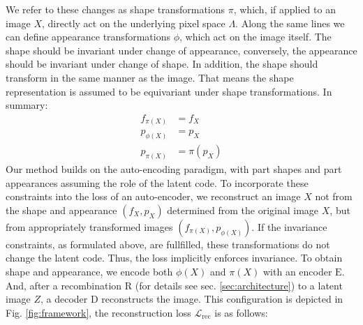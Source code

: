 	We refer to these changes as shape transformations $\pi$, which, if applied to an image $X$, directly act on the underlying pixel space $\Lambda$.
	Along the same lines we can define appearance transformations $\phi$, which act on the image itself.
	The shape should be invariant under change of appearance, conversely, the appearance should be invariant under change of shape.
	In addition, the shape should transform in the same manner as the image.
	That means the shape representation is assumed to be equivariant under shape transformations.
	In summary:
	\begin{align}
		f_{\pi(X)}  &= f_{X} \tag{invariance of appearance}\\
		p_{\phi(X)} &= p_X  \tag{invariance of shape}\\
		p_{\pi(X)} &= \pi(p_X) \tag{equivariance of shape}
	\label{eq:invar}
	\end{align} %
	Our method builds on the auto-encoding paradigm, with part shapes and part appearances assuming the role of the latent code.
	To incorporate these constraints into the loss of an auto-encoder, we reconstruct an image $X$ not from the shape and appearance $(f_X, p_X)$ determined from the original image $X$, but from appropriately transformed images $(f_{\pi(X)}, p_{\phi(X)})$.
	If the invariance constraints, as formulated above, are fullfilled, these transformations do not change the latent code.
	Thus, the loss implicitly enforces invariance.
	To obtain shape and appearance, we encode both $\phi(X)$ and $\pi(X)$ with an encoder $\mathrm{E}$.
	And, after a recombination $\mathrm{R}$ (for details see sec. \ref{sec:architecture}) to a latent image $Z$, a decoder $\mathrm{D}$ reconstructs the image.
	This configuration is depicted in Fig. \ref{fig:framework}, the reconstruction loss $\mathcal{L}_{\textrm{rec}}$ is as follows:
